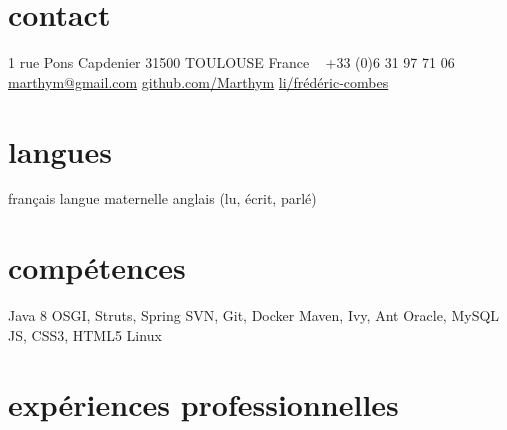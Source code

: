 \documentclass{friggeri-cv} 	%
\begin{document}


\begin{aside} %
\section{contact}
1 rue Pons Capdenier
31500 TOULOUSE
France
~
+33 (0)6 31 97 71 06
\href{mailto:marthym@gmail.com}{marthym@gmail.com}
\href{https://github.com/Marthym}{github.com/Marthym}
\href{https://fr.linkedin.com/pub/frédéric-combes/91/820/108/}{li/frédéric-combes}
\section{langues}
français langue maternelle
anglais (lu, écrit, parlé)
\section{compétences}
Java 8
OSGI, Struts, Spring
SVN, Git, Docker
Maven, Ivy, Ant
Oracle, MySQL
JS, CSS3, HTML5
Linux
\end{aside}

\section{expériences professionnelles}
\end{document}
